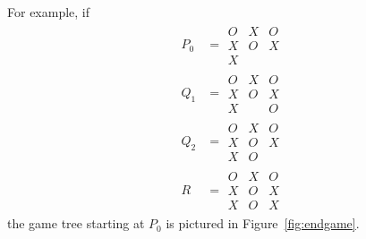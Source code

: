 \begin{definition}
For example, if
\begin{align*}
P_0 & =  \begin{array}{c|c|c}
                O & X & O\\
         \hline X & O & X\\
         \hline X & &
        \end{array}\\
Q_1 & = \begin{array}{c|c|c}
                O & X & O\\
         \hline X & O & X\\
         \hline X &  & O
        \end{array}\\
Q_2 & = \begin{array}{c|c|c}
                O & X & O\\
         \hline X & O & X\\
         \hline X & O & 
        \end{array}\\
R & = \begin{array}{c|c|c}
                O & X & O\\
         \hline X & O & X\\
         \hline X & O & X
        \end{array}
\end{align*}
the game tree starting at $P_0$ is pictured in Figure~\ref{fig:endgame}.

\end{definition}
